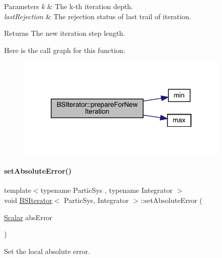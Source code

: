 \begin{DoxyParams}{Parameters}
{\em k} & The k-\/th iteration depth. \\
\hline
{\em last\+Rejection} & The rejection status of last trail of iteration. \\
\hline
\end{DoxyParams}
\begin{DoxyReturn}{Returns}
The new iteration step length. 
\end{DoxyReturn}
Here is the call graph for this function\+:\nopagebreak
\begin{figure}[H]
\begin{center}
\leavevmode
\includegraphics[width=287pt]{class_b_s_iterator_a738a558ddfacd9959c9438862001d7e8_cgraph}
\end{center}
\end{figure}
\mbox{\label{class_b_s_iterator_a57603539823be271c2229d0951b7d957}} 
\paragraph{\texorpdfstring{set\+Absolute\+Error()}{setAbsoluteError()}}
{\footnotesize\ttfamily template$<$typename Partic\+Sys , typename Integrator $>$ \\
void \mbox{\hyperlink{class_b_s_iterator}{B\+S\+Iterator}}$<$ Partic\+Sys, Integrator $>$\+::set\+Absolute\+Error (\begin{DoxyParamCaption}\item[{\mbox{\hyperlink{class_b_s_iterator_a7857f8ff9032955ea4dcc22cd18ca7a1}{Scalar}}}]{abs\+Error }\end{DoxyParamCaption})\hspace{0.3cm}{\ttfamily [inline]}}



Set the local absolute error. 

